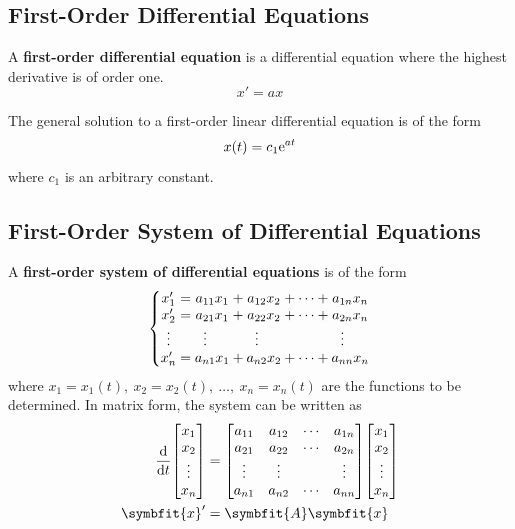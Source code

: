\documentclass{article}
\begin{document}
	\subsection{First-Order Differential Equations}
	\begin{definition}
		A \textbf{first-order differential equation} is a differential equation where the highest derivative is of order one. 
		\begin{equation*}
			x' = a x
		\end{equation*}
	\end{definition}
	\begin{theorem}
		The general solution to a first-order linear differential equation is of the form
		\begin{equation*}
			x(t) = c_1 \mathrm{e}^{a t}
		\end{equation*}
		where $c_1$ is an arbitrary constant.
	\end{theorem}
	\subsection{First-Order System of Differential Equations}
	\begin{definition}
		A \textbf{first-order system of differential equations} is of the form
		\begin{equation*}
			\left\{
			\setlength\arraycolsep{0pt}
			\begin{array}{ c >{{}}c<{{}} c >{{}}c<{{}} c >{{}}c<{{}} c >{{}}c<{{}} c  }
			x'_1               &=& a_{11}x_1                         &+& a_{12}x_2                         &+& \cdots &+& a_{1n}x_n \\
			x'_2               &=& a_{21}x_1                         &+& a_{22}x_2                         &+& \cdots &+& a_{2n}x_n \\
			\vdotswithin{x'_3} & & \vdotswithin{a_{31}}\phantom{x_1} & & \vdotswithin{a_{32}}\phantom{x_2} & &        & & \vdotswithin{a_{3n}}\phantom{x_n} \\ 
			x'_n               &=& a_{n1}x_1                         &+& a_{n2}x_2                         &+& \cdots &+& a_{nn}x_n 
			\end{array}
			\right.
		\end{equation*}
		where $x_1=x_1(t),\: x_2=x_2(t),\: \dots,\: x_n=x_n(t)$ are the functions to be determined. In matrix form, the system can be written as
		\begin{align*}
			\dv{t}\mqty[x_1 \\ x_2 \\ \vdots \\ x_n] &= \mqty[
				a_{11} & a_{12} & \cdots & a_{1n} \\
				a_{21} & a_{22} & \cdots & a_{2n} \\
				\vdots & \vdots &        & \vdots \\
				a_{n1} & a_{n2} & \cdots & a_{nn}
			] \mqty[x_1 \\ x_2 \\ \vdots \\ x_n] \\
			\symbfit{x}' &= \symbfit{A} \symbfit{x}
		\end{align*}
	\end{definition}
\end{document}
